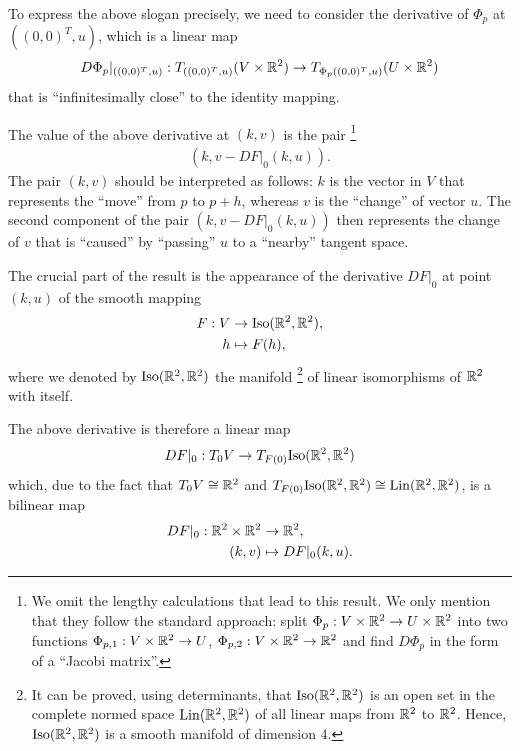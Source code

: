 \documentclass[11pt,a4paper,twoside,openany]{report}
\theoremstyle{my-theorem}
\theoremstyle{non-theorem}
\begin{document}
			To express the above slogan precisely, we need to consider the derivative of $\Phi_p$ at $((0,0)^T,u)$, which is a linear map
			\begin{align*}
				D\Phi_p|_{((0,0)^T,u)}: T_{((0,0)^T,u)}(V\times{\mathbb R}^2) \to T_{\Phi_p((0,0)^T,u)}(U\times{\mathbb R}^2)
			\end{align*}
			that is ``infinitesimally close'' to the identity mapping.
			
			The value of the above derivative at $(k,v)$ is the pair%
			\footnote{We omit the lengthy calculations that lead to this result. We only mention that they follow the standard approach: split $\Phi_p: V \times {\mathbb R}^2 \to U \times {\mathbb R}^2$ into two functions $\Phi_{p,1}: V \times {\mathbb R}^2 \to U$, $\Phi_{p,2}: V \times {\mathbb R}^2 \to {\mathbb R}^2$ and find $D\Phi_p$ in the form of a ``Jacobi matrix''.}
			\begin{align*}
				(k,v-DF|_0(k,u)).
			\end{align*}
			The pair $(k,v)$ should be interpreted as follows: $k$ is the vector in $V$ that represents the ``move'' from $p$ to $p+h$, whereas $v$ is the ``change'' of vector $u$. The second component of the pair $(k,v-DF|_0(k,u))$ then represents the change of $v$ that is ``caused'' by ``passing'' $u$ to a ``nearby'' tangent space.
			
			The crucial part of the result is the appearance of the derivative $DF|_0$ at point $(k,u)$ of the smooth mapping
			\begin{align*}
				F: V &\to {\operatorname{Iso}}({\mathbb R}^2,{\mathbb R}^2),
			\\
				h &\mapsto F(h),
			\end{align*}
			where we denoted by ${\operatorname{Iso}}({\mathbb R}^2,{\mathbb R}^2)$ the manifold%
			\footnote{It can be proved, using determinants, that ${\operatorname{Iso}}({\mathbb R}^2,{\mathbb R}^2)$ is an open set in the complete normed space ${\operatorname{Lin}}({\mathbb R}^2,{\mathbb R}^2)$ of all linear maps from ${\mathbb R}^2$ to ${\mathbb R}^2$. Hence, ${\operatorname{Iso}}({\mathbb R}^2,{\mathbb R}^2)$ is a smooth manifold of dimension $4$.}
			of linear isomorphisms of ${\mathbb R}^2$ with itself.
			
			The above derivative is therefore a linear map
			\begin{align*}
				DF|_0: T_0V \to T_{F(0)}{\operatorname{Iso}}({\mathbb R}^2,{\mathbb R}^2)
			\end{align*}
			which, due to the fact that $T_0V \cong {\mathbb R}^2$ and $T_{F(0)}{\operatorname{Iso}}({\mathbb R}^2,{\mathbb R}^2) \cong {\operatorname{Lin}}({\mathbb R}^2,{\mathbb R}^2)$, is a bilinear map
			\begin{align*}
				DF|_0: {\mathbb R}^2\times{\mathbb R}^2 &\to {\mathbb R}^2,
			\\
				(k,v) &\mapsto DF|_0(k,u).
			\end{align*}
			
\end{document}
